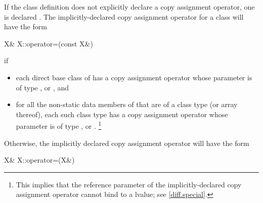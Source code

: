 \documentclass[american]{book}
\begin{document}
\setcounter{Paras}{9}
\pnum
{}%
If the class definition does not explicitly declare a copy assignment operator,
one is declared
.
The implicitly-declared copy assignment operator for a class
will have the form

\begin{codeblock}
X& X::operator=(const X&)
\end{codeblock}

if

\begin{itemize}
\item
each direct base class
of
has a copy assignment operator whose parameter is of type
,
or
,
and
\item
for all the non-static data members of
that are of a class type
(or array thereof),
each such class type has a copy assignment operator whose parameter is of type
,
or
.%
\footnote{
This implies that the reference parameter of the
implicitly-declared copy assignment operator cannot bind to a
lvalue; see \ref{diff.special}.
}
\end{itemize}

Otherwise, the implicitly declared copy
assignment operator
will have the form

\begin{codeblock}
X& X::operator=(X&)
\end{codeblock}
\end{document}
